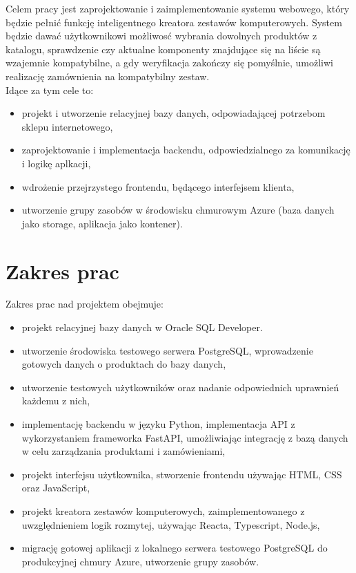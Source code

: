 \documentclass[a4paper,twoside,12pt]{book}
\begin{document}
Celem pracy jest zaprojektowanie i zaimplementowanie systemu webowego, który będzie pełnić funkcję inteligentnego kreatora zestawów komputerowych. System będzie dawać użytkownikowi możliwosć wybrania dowolnych produktów z katalogu, sprawdzenie czy  aktualne komponenty znajdujące się na liście są wzajemnie kompatybilne, a gdy weryfikacja zakończy się pomyślnie, umożliwi realizację zamównienia na kompatybilny zestaw. 
\vspace{0.5cm}
\\
Idące za tym cele to:
\begin{itemize} 
	\item projekt i utworzenie relacyjnej bazy danych, odpowiadającej potrzebom sklepu internetowego,
	\item zaprojektowanie i implementacja backendu, odpowiedzialnego za komunikację i logikę aplkacji, 
	\item wdrożenie przejrzystego frontendu, będącego interfejsem klienta,
	\item utworzenie grupy zasobów w środowisku chmurowym Azure (baza danych jako storage, aplikacja jako kontener).
\end{itemize}
\section{Zakres prac}
Zakres prac nad projektem obejmuje:
\begin{itemize}
	\item projekt relacyjnej bazy danych w Oracle SQL Developer.
	\item utworzenie środowiska testowego serwera PostgreSQL, wprowadzenie gotowych danych o produktach do bazy danych,
	\item utworzenie testowych użytkowników oraz nadanie odpowiednich uprawnień każdemu z nich,
	\item implementację backendu w języku Python, implementacja API z wykorzystaniem frameworka FastAPI, umożliwiając integrację z bazą danych w celu zarządzania produktami i zamówieniami,
	\item projekt interfejsu użytkownika, stworzenie frontendu używając HTML, CSS oraz JavaScript,
	\item projekt kreatora zestawów komputerowych, zaimplementowanego z uwzględnieniem logik rozmytej, używając Reacta, Typescript, Node.js,
	\item migrację gotowej aplikacji z lokalnego serwera testowego PostgreSQL do produkcyjnej chmury Azure, utworzenie grupy zasobów.
	
\end{itemize}
\newpage
\end{document}
